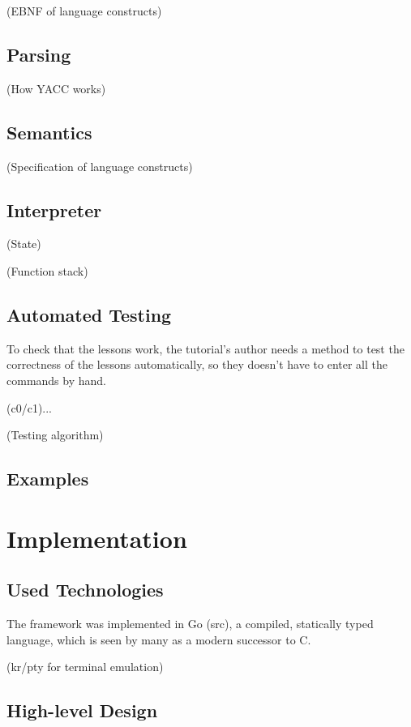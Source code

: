 \documentclass[twoside,blue]{tubsreprt}
\begin{document}
(EBNF of language constructs)

\section{Parsing}

(How YACC works)

\section{Semantics}

(Specification of language constructs)

\section{Interpreter}

(State)

(Function stack)

\section{Automated Testing}

To check that the lessons work, the tutorial's author needs a method to test the correctness of the lessons automatically, so they doesn't have to enter all the commands by hand.

(c0/c1)...

(Testing algorithm)

\section{Examples}

\chapter{Implementation}

\section{Used Technologies}

The framework was implemented in Go (src), a compiled, statically typed language, which is seen by many as a modern successor to C.

(kr/pty for terminal emulation)

\section{High-level Design}
\end{document}
